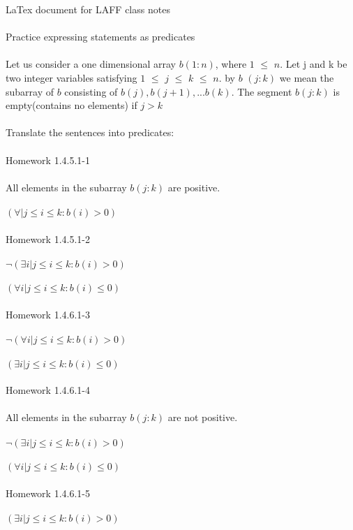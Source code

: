 \documentclass[11pt]{article}
\begin{document}
LaTex document for LAFF class notes
\\
\\
Practice expressing statements as predicates
\\
\\
Let us consider a one dimensional array $b(1:n)$,
where $1$ $\leq$ $n$. Let j and k be two 
integer variables satisfying $1$ $\leq$ $j$ $ \leq$ $k$ $\leq$ $n$. by $b$ $(j:k)$ we mean the subarray of $b$
consisting of $b(j), b(j+1),...b(k)$. The segment $b(j:k)$ is empty(contains no elements) if $j > k$
\\
\\
Translate the sentences into predicates: 
\\
\\
Homework 1.4.5.1-1
\\
\\
All elements in the subarray $b(j:k)$ are positive.
\\
\\
$( \forall | j \leq i \leq k : b(i) > 0)$
\\
\\
Homework 1.4.5.1-2
\\
\\
$\neg(\exists i| j \leq i \leq k : b(i) > 0)$
\\
\\
$(\forall i | j \leq i \leq k : b(i) \leq 0)$
\\
\\
Homework 1.4.6.1-3
\\
\\
$\neg(\forall i| j \leq i \leq k : b(i) > 0)$
\\
\\
$(\exists i| j \leq i \leq k: b(i) \leq 0)$
\\
\\
Homework 1.4.6.1-4
\\
\\
All elements in the subarray $b(j : k)$ are not positive.
\\
\\
$\neg(\exists i| j \leq i \leq k : b(i) > 0)$
\\
\\
$(\forall i| j \leq i \leq k : b(i) \leq 0)$
\\
\\
Homework 1.4.6.1-5
\\
\\
$(\exists i|j \leq i \leq k : b(i) > 0)$
\\
\\
\end{document}

